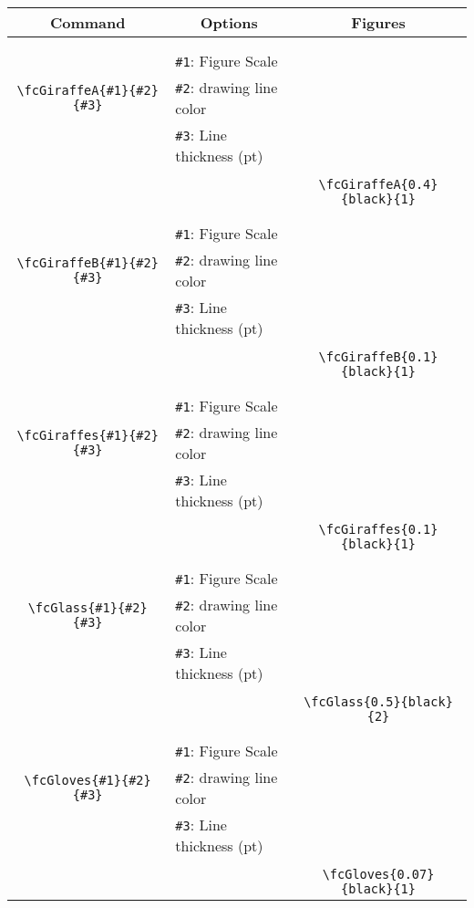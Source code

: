\documentclass[x11names]{article}
\begin{document}
\begin{table}[H]\centering\begin{tabular}{|c|l|c|}\hline {\bf Command}& \multicolumn{1}{c|}{{\bf Options}} & {\bf Figures}\\  \hline	&&\multirow{5}{*}{\fcGiraffeA{0.4}{black}{1}}\\	&&\\	&\verb|#1|: Figure Scale &\\	\verb|\fcGiraffeA{#1}{#2}{#3}|&	\verb|#2|: drawing line color &\\	&\verb|#3|: Line thickness (pt) &\\ &&\\&&	\verb|\fcGiraffeA{0.4}{black}{1}|\\\hline 	
	&&\multirow{5}{*}{\fcGiraffeB{0.1}{black}{1}}\\	&&\\	&\verb|#1|: Figure Scale &\\	\verb|\fcGiraffeB{#1}{#2}{#3}|&	\verb|#2|: drawing line color &\\	&\verb|#3|: Line thickness (pt) &\\ &&\\&&	\verb|\fcGiraffeB{0.1}{black}{1}|\\\hline 	
	&&\multirow{5}{*}{\fcGiraffes{0.1}{black}{1}}\\	&&\\	&\verb|#1|: Figure Scale &\\	\verb|\fcGiraffes{#1}{#2}{#3}|&	\verb|#2|: drawing line color &\\	&\verb|#3|: Line thickness (pt) &\\ &&\\&&	\verb|\fcGiraffes{0.1}{black}{1}|\\\hline 	
	&&\multirow{5}{*}{\fcGlass{0.5}{black}{2}}\\	&&\\	&\verb|#1|: Figure Scale &\\	\verb|\fcGlass{#1}{#2}{#3}|&	\verb|#2|: drawing line color &\\	&\verb|#3|: Line thickness (pt) &\\ &&\\&&	\verb|\fcGlass{0.5}{black}{2}|\\\hline 	
	&&\multirow{5}{*}{\fcGloves{0.07}{black}{1}}\\	&&\\	&\verb|#1|: Figure Scale &\\	\verb|\fcGloves{#1}{#2}{#3}|&	\verb|#2|: drawing line color &\\	&\verb|#3|: Line thickness (pt) &\\ &&\\&&	\verb|\fcGloves{0.07}{black}{1}|\\\hline 	

\end{tabular}
\end{table}
\end{document}
